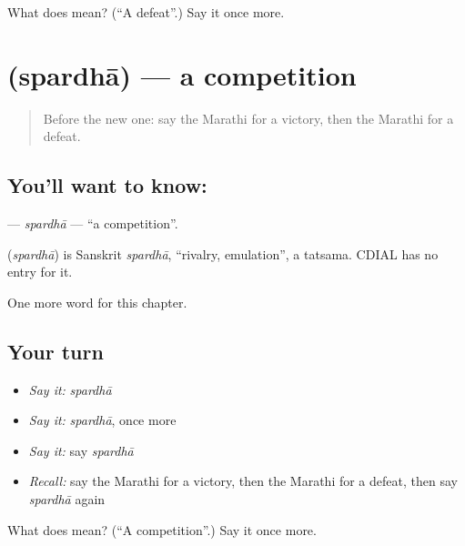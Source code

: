 \begin{tcolorbox}[breakable,colback=teal!4,colframe=teal!35!black,title={Before you move on}]
What does  mean? (\textquotedblleft{}A defeat\textquotedblright{}.) Say it once more.
\end{tcolorbox}
\section[\texorpdfstring{\mr{स्पर्धा} (spardhā)}{स्पर्धा (spardhā)}]{ (spardhā) — a competition}

\label{lesson:MR-C185-spardha}



\begin{quote}
Before the new one: say the Marathi for a victory, then the Marathi for a defeat.
\end{quote}

\subsection*{You'll want to know: }
\textbf{} — \emph{spardhā} — \textquotedblleft{}a competition\textquotedblright{}.

\begin{cousinweb}
\textbf{} (\emph{spardhā}) is Sanskrit \emph{spardhā}, \textquotedblleft{}rivalry, emulation\textquotedblright{}, a tatsama. CDIAL has no entry for it.
\end{cousinweb}

\begin{grammarlens}[title={What you've built}]
One more word for this chapter.
\end{grammarlens}

\subsection*{Your turn}
\begin{itemize}
\raggedright
  \item \emph{Say it:} \emph{spardhā}
  \item \emph{Say it:} \emph{spardhā}, once more
  \item \emph{Say it:} say \emph{spardhā}
  \item \emph{Recall:} say the Marathi for a victory, then the Marathi for a defeat, then say \emph{spardhā} again
\end{itemize}

\begin{tcolorbox}[breakable,colback=teal!4,colframe=teal!35!black,title={Before you move on}]
What does  mean? (\textquotedblleft{}A competition\textquotedblright{}.) Say it once more.
\end{tcolorbox}
